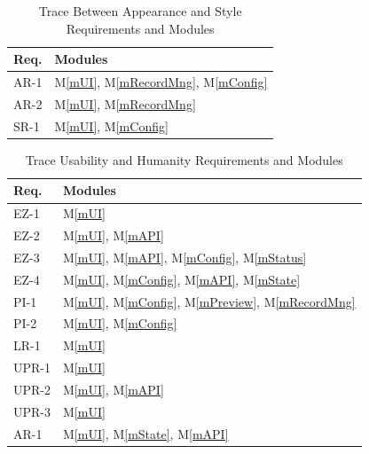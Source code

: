 \documentclass[12pt, titlepage]{article}
\newcommand{\mref}[1]{M\ref{#1}}
\begin{document}
\begin{table}[H]
  \centering
  \begin{tabular}{p{} p{}}
    \toprule
    \textbf{Req.} & \textbf{Modules}                               \\
    \midrule
    AR-1          & \mref{mUI},  \mref{mRecordMng}, \mref{mConfig} \\
    AR-2          & \mref{mUI},  \mref{mRecordMng}                 \\
    SR-1          & \mref{mUI}, \mref{mConfig}                     \\
    \bottomrule
  \end{tabular}
  \caption{Trace Between Appearance and Style Requirements and Modules}
  \label{TblAppearanceStyleModules}
\end{table}

\begin{table}[H]
  \centering
  \begin{tabular}{p{} p{}}
    \toprule
    \textbf{Req.} & \textbf{Modules}                                               \\
    \midrule
    EZ-1          & \mref{mUI}                                                     \\
    EZ-2          & \mref{mUI}, \mref{mAPI}                                        \\
    EZ-3          & \mref{mUI},  \mref{mAPI}, \mref{mConfig}, \mref{mStatus}       \\
    EZ-4          & \mref{mUI},  \mref{mConfig}, \mref{mAPI}, \mref{mState}        \\
    PI-1          & \mref{mUI}, \mref{mConfig}, \mref{mPreview}, \mref{mRecordMng} \\
    PI-2          & \mref{mUI}, \mref{mConfig}                                     \\
    LR-1          & \mref{mUI}                                                     \\
    UPR-1         & \mref{mUI}                                                     \\
    UPR-2         & \mref{mUI}, \mref{mAPI}                                        \\
    UPR-3         & \mref{mUI}                                                     \\
    AR-1          & \mref{mUI},  \mref{mState}, \mref{mAPI}                        \\
    \bottomrule
  \end{tabular}
  \caption{Trace Usability and Humanity Requirements and Modules}
  \label{TblUsabilityModules}
\end{table}
\end{document}
